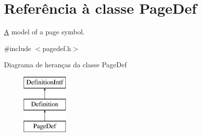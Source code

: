 \hypertarget{class_page_def}{\section{Referência à classe Page\-Def}
\label{class_page_def}
}


\hyperlink{class_a}{A} model of a page symbol.  




{\ttfamily \#include $<$pagedef.\-h$>$}

Diagrama de heranças da classe Page\-Def\begin{figure}[H]
\begin{center}
\leavevmode
\includegraphics[height=3.000000cm]{class_page_def}
\end{center}
\end{figure}
